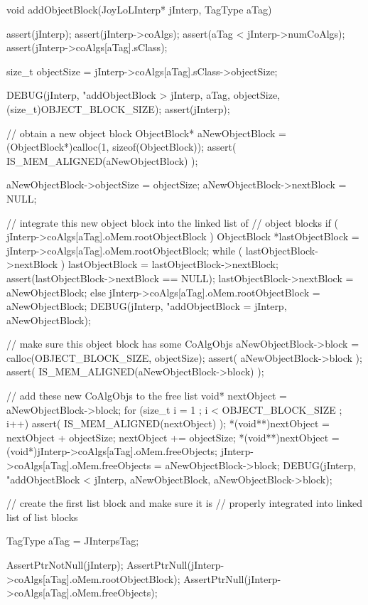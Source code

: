 \startCCode
void addObjectBlock(JoyLoLInterp* jInterp, TagType aTag) {
  assert(jInterp);
  assert(jInterp->coAlgs);
  assert(aTag < jInterp->numCoAlgs);
  assert(jInterp->coAlgs[aTag].sClass);

  size_t objectSize = jInterp->coAlgs[aTag].sClass->objectSize;

  DEBUG(jInterp, "addObjectBlock > %
    jInterp, aTag, objectSize, (size_t)OBJECT_BLOCK_SIZE);
  assert(jInterp);
  
  // obtain a new object block
  ObjectBlock* aNewObjectBlock = 
    (ObjectBlock*)calloc(1, sizeof(ObjectBlock));
  assert( IS_MEM_ALIGNED(aNewObjectBlock) );

  aNewObjectBlock->objectSize = objectSize;
  aNewObjectBlock->nextBlock  = NULL;
  
  // integrate this new object block into the linked list of
  // object blocks
  if ( jInterp->coAlgs[aTag].oMem.rootObjectBlock ) {
    ObjectBlock *lastObjectBlock = jInterp->coAlgs[aTag].oMem.rootObjectBlock;
    while ( lastObjectBlock->nextBlock ) {
      lastObjectBlock = lastObjectBlock->nextBlock;
    }
    assert(lastObjectBlock->nextBlock == NULL);
    lastObjectBlock->nextBlock = aNewObjectBlock;
  } else {
    jInterp->coAlgs[aTag].oMem.rootObjectBlock = aNewObjectBlock;
  }
  DEBUG(jInterp, "addObjectBlock = %
    jInterp, aNewObjectBlock);

  // make sure this object block has some CoAlgObjs
  aNewObjectBlock->block = 
    calloc(OBJECT_BLOCK_SIZE, objectSize);
  assert( aNewObjectBlock->block );
  assert( IS_MEM_ALIGNED(aNewObjectBlock->block) );
  
  // add these new CoAlgObjs to the free list
  void* nextObject = aNewObjectBlock->block;
  for (size_t i = 1 ; i < OBJECT_BLOCK_SIZE ; i++) {
    assert( IS_MEM_ALIGNED(nextObject) );
    *(void**)nextObject = nextObject + objectSize;
    nextObject += objectSize;
  }
  *(void**)nextObject =
    (void*)jInterp->coAlgs[aTag].oMem.freeObjects;
  jInterp->coAlgs[aTag].oMem.freeObjects = aNewObjectBlock->block;
  DEBUG(jInterp, "addObjectBlock < %
    jInterp, aNewObjectBlock, aNewObjectBlock->block);
}
\stopCCode

\startCTest
  // create the first list block and make sure it is 
  // properly integrated into linked list of list blocks

  TagType aTag = JInterpsTag;
    
  AssertPtrNotNull(jInterp);
  AssertPtrNull(jInterp->coAlgs[aTag].oMem.rootObjectBlock);
  AssertPtrNull(jInterp->coAlgs[aTag].oMem.freeObjects);

